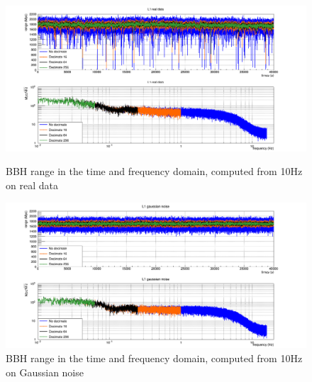 \begin{figure}
  \centering
  \begin{minipage}{\linewidth}
    \includegraphics[width=\linewidth]{sectionBadTriggers/PSD/Range/range_PSD/cReal_L1_BBH.png}
    \caption{BBH range in the time and frequency domain, computed from 10Hz on real data}
    \label{fig:rangeReal_BBH_10}
  \end{minipage}
  \hfill
  \vspace{0.4cm}
  \begin{minipage}{\linewidth}
    \includegraphics[width=\linewidth]{sectionBadTriggers/PSD/Range/range_PSD/cGaus_L1_BBH.png}
    \caption{BBH range in the time and frequency domain, computed from 10Hz on Gaussian noise}
    \label{fig:rangeGaus_BBH_10}
  \end{minipage}
\end{figure}


